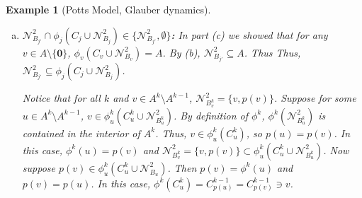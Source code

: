\documentclass[12pt]{article}
\newcommand{\mc}{\mathcal}
\newcommand{\ind}{\hspace{24pt}}
\newcommand{\dneigh}[1]{\mc{N}^2_{#1}}			%
\renewcommand{\root}{\mathbf{0}}					%
\newcommand{\indx}[1]{^{#1}}						%
\newtheorem{example}[thms]{Example}
\begin{document}
\begin{example}[Potts Model, Glauber dynamics]
\begin{description}
\begin{enumerate}[(a)]
Furthermore, since \(\phi_v\) is an automorphism and \(\phi_v(C_v\cup\dneigh{B_v}) = A\), it follows that \(\phi_v(B_v\setminus C_v)\cap A = \emptyset\).

\texttt{[image: phismall.jpg]}

For \(v \in A\indx{k}\setminus A\indx{k-1}\), we use a slightly different automorphism (see figure 4 for an example of \(\phi\indx{2}_{111}\)). \(\phi\indx{k}_v(v) = p(v)\) and \(\phi\indx{k}_v(p(v)) = p(p(v))\). This isn't possible in the \(k=0\) case because \(\root\) does not have any parents, but it is possible in general. Then \(\phi\indx{k}_v(C\indx{k}_v) = \phi\indx{k}_v(\{v1,\dots,v(d-1)\}) = \{p(v)1,\dots,p(v)(d-1)\} = C\indx{k-1}_{p(v)}\). Thus,

\[\phi\indx{k}_v(C\indx{k}_v\cup\dneigh{B\indx{k}_v}) = C\indx{k-1}_{p(v)}\cup \{p(v),p(p(v))\} \subset A.\]

Notice that \(\phi\indx{k}_v\) preserves the parent/descendant structure of all descendants of \(v\). Since each \(u\in B_v\setminus C_v\) is a descendant of some \(u' \in C\indx{k}_v\), \(\phi\indx{k}_v(u)\) is a descendant of \(\phi\indx{k}_v(u')\), but \(\phi\indx{k}_v(u')\) is a leaf of \(A\indx{k}\), so \(\phi\indx{k}_v(u) \notin A\indx{k}\). It follows that \(\phi\indx{k}_v(B\indx{k}_v\setminus C\indx{k}_v)\cap A\indx{k} = \emptyset\).

\texttt{[image: phibig.jpg]}

\item {\bfseries\boldmath\(\dneigh{B_{j'}}\cap\phi_j(C_j\cup\dneigh{B_j}) \in \{\dneigh{B_{j'}},\emptyset\}\):} In part (c) we showed that for any \(v \in A\setminus\{\root\}\), \(\phi_v(C_v\cup\dneigh{B_v}) = A\). By (b), \(\dneigh{B_{j'}} \subseteq A\). Thus Thus, \(\dneigh{B_{j'}} \subseteq\phi_j(C_j\cup\dneigh{B_j})\).

\ind Notice that for all \(k\) and \(v \in A\indx{k}\setminus A\indx{k-1}\), \(\dneigh{B\indx{k}_v} = \{v,p(v)\}\). Suppose for some \(u \in A\indx{k}\setminus A\indx{k-1}\), \(v \in \phi\indx{k}_u(C\indx{k}_u\cup\dneigh{B\indx{k}_u})\). By definition of \(\phi\indx{k}\), \(\phi\indx{k}(\dneigh{B\indx{k}_u})\) is contained in the interior of \(A\indx{k}\). Thus, \(v \in \phi\indx{k}_u(C\indx{k}_u)\), so \(p(u) = p(v)\). In this case, \(\phi\indx{k}(u) = p(v)\) and \(\dneigh{B\indx{k}_v} = \{v,p(v)\}\subset \phi\indx{k}_u(C\indx{k}_u\cup\dneigh{B\indx{k}_u})\). Now suppose \(p(v) \in \phi\indx{k}_u(C\indx{k}_u\cup\dneigh{B_u})\). Then \(p(v) = \phi\indx{k}(u)\) and \(p(v) = p(u)\). In this case, \(\phi\indx{k}(C\indx{k}_u) = C\indx{k-1}_{p(u)} = C\indx{k-1}_{p(v)} \ni v\).


\end{enumerate}
\end{description}
\end{example}
\end{document}
